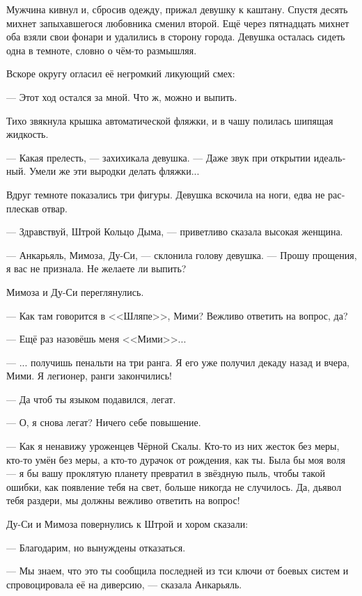 \documentclass[a4paper,12pt,fleqn]{book}\usepackage{polyglossia}\setdefaultlanguage[babelshorthands=true]{russian}\setotherlanguage{english}\defaultfontfeatures{Ligatures=TeX,Mapping=tex-text}\usepackage{xcolor}\newcommand{\ml}[3]{#2}
\begin{document}
Мужчина кивнул и, сбросив одежду, прижал девушку к каштану.
Спустя десять михнет запыхавшегося любовника сменил второй.
Ещё через пятнадцать михнет оба взяли свои фонари и удалились в сторону города.
Девушка осталась сидеть одна в темноте, словно о чём-то размышляя.

Вскоре округу огласил её негромкий ликующий смех:

--- Этот ход остался за мной.
Что ж, можно и выпить.

Тихо звякнула крышка автоматической фляжки, и в чашу полилась шипящая жидкость.

--- Какая прелесть, --- захихикала девушка.
--- Даже звук при открытии идеальный.
Умели же эти выродки делать фляжки...

Вдруг темноте показались три фигуры.
Девушка вскочила на ноги, едва не расплескав отвар.

--- Здравствуй, Штрой Кольцо Дыма, --- приветливо сказала высокая женщина.

--- Анкарьяль, Мимоза, Ду-Си, --- склонила голову девушка.
--- Прошу прощения, я вас не признала.
Не желаете ли выпить?

Мимоза и Ду-Си переглянулись.

--- Как там говорится в <<Шляпе>>, Мими?
Вежливо ответить на вопрос, да?

--- Ещё раз назовёшь меня <<Мими>>...

---  ... получишь пенальти на три ранга.
Я его уже получил декаду назад и вчера, Мими.
\ml{$0$}
{Я легионер, ранги закончились!}
{I'm a leggionaire, I'm out of ranks!''}

\ml{$0$}
{--- Да чтоб ты языком подавился, легат.}
{``Choke on your tongue, legate.''}

\ml{$0$}
{--- О, я снова легат?}
{``Whoa, I'm a legate, again?}
\ml{$0$}
{Ничего себе повышение.}
{Quite a promotion.''}

--- Как я ненавижу уроженцев Чёрной Скалы.
Кто-то из них жесток без меры, кто-то умён без меры, а кто-то дурачок от рождения, как ты.
Была бы моя воля --- я бы вашу проклятую планету превратил в звёздную пыль, чтобы такой ошибки, как появление тебя на свет, больше никогда не случилось.
Да, дьявол тебя раздери, мы должны вежливо ответить на вопрос!

Ду-Си и Мимоза повернулись к Штрой и хором сказали:

--- Благодарим, но вынуждены отказаться.

--- Мы знаем, что это ты сообщила последней из тси ключи от боевых систем и спровоцировала её на диверсию, --- сказала Анкарьяль.
\end{document}
